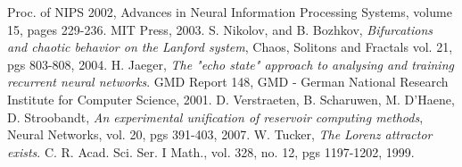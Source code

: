 \documentclass{elsart1p}
\begin{document}
\begin{thebibliography}{widest-label}
 Proc. of NIPS 2002, 
 Advances in Neural Information Processing Systems, 
 volume 15, 
 pages 229-236. 
 MIT Press, 
 2003.
 S. Nikolov, and B. Bozhkov,
 \emph{Bifurcations and chaotic behavior on the Lanford system},
 Chaos, Solitons and Fractals
 vol. 21,
 pgs 803-808,
 2004.
  H. Jaeger,
  \emph{The "echo state" approach to analysing and training recurrent neural networks}. 
  GMD Report 148, 
  GMD - German National Research Institute for Computer Science,
  2001.
 D. Verstraeten, B. Scharuwen, M. D'Haene, D. Stroobandt,
 \emph{An experimental unification of reservoir computing methods},
 Neural Networks,
 vol. 20,
 pgs 391-403,
 2007.
 W. Tucker,
 \emph{The Lorenz attractor exists}.
 C. R. Acad. Sci. Ser. I Math.,
 vol. 328,
 no. 12,
 pgs 1197-1202,
 1999.
\end{thebibliography}
\end{document}
